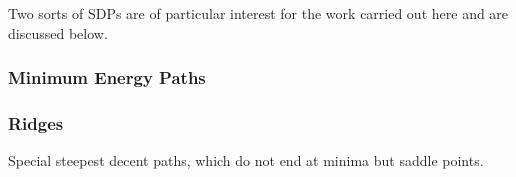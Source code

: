 \placeholder

Two sorts of SDPs are of particular interest for the work carried out here and are discussed below.

\subsubsection{Minimum Energy Paths}
\label{sec:meps}

\placeholder

\subsubsection{Ridges}
\label{sec:ridges}

Special steepest decent paths, which do not end at minima but saddle points.

\placeholder


